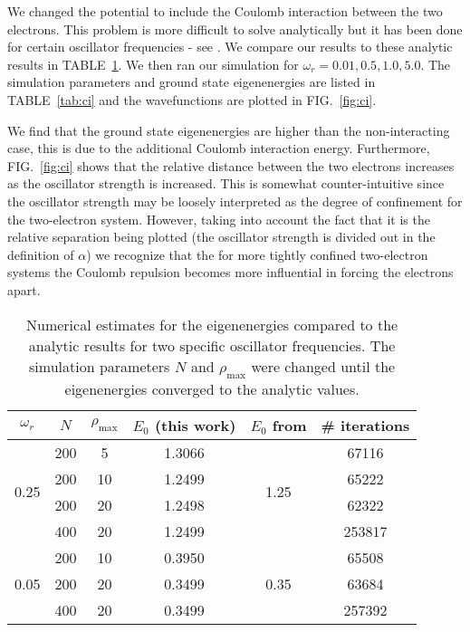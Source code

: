 \documentclass[10pt,showpacs,preprintnumbers,footinbib,amsmath,amssymb,aps,prl,twocolumn,groupedaddress,superscriptaddress,showkeys]{revtex4-1}
\newcommand{\rhomax}{
	\ensuremath{ \rho _{\mathrm{max}}} }
\begin{document}
{We changed the potential to include the Coulomb interaction between the two electrons.
This problem is more difficult to solve analytically but it has been done for certain oscillator
frequencies - see \citet{Taut1993}. We compare our results to these analytic results in
TABLE~\ref{tab:wrc}. We then ran our simulation for $\omega_r = 0.01,0.5,1.0,5.0$.
The simulation parameters and ground state eigenenergies are listed in TABLE~\ref{tab:ci}
and the wavefunctions are plotted in FIG.~\ref{fig:ci}.

We find that the ground state eigenenergies are higher than the non-interacting case,
this is due to the additional Coulomb interaction energy. Furthermore, FIG.~\ref{fig:ci}
shows that the relative distance between the two electrons increases as the oscillator strength
is increased. This is somewhat counter-intuitive since the oscillator strength may be loosely
interpreted as the degree of confinement for the two-electron system. However, taking into
account the fact that it is the relative separation being plotted (the oscillator strength is
divided out in the definition of $\alpha$) we recognize that the for more tightly confined
two-electron systems the Coulomb repulsion becomes more influential in forcing the electrons
apart.

\begin{table}
\centering
	\begin{tabular}{ c | c c | c c | c }
	$\omega_r$ & $N$ & \rhomax & $E_0$ (this work) & $E_0$ from \citep{Taut1993} & \# iterations\\
\hline
	\multirow{4}{*}{0.25} & 200 &   5 &  1.3066 & \multirow{4}{*}{1.25} & 67116\\
				         & 200 & 10 &  1.2499 &                                      & 65222\\
				         & 200 & 20 &  1.2498 &                                      & 62322\\
				         & 400 & 20 &  1.2499 &                                      & 253817\\
\hline
	\multirow{3}{*}{0.05} & 200 & 10 &  0.3950 & \multirow{3}{*}{0.35} & 65508\\
				         & 200 & 20 & 0.3499  &                                      & 63684\\
				         & 400 & 20 & 0.3499  &                                      & 257392 
	\end{tabular}
	\caption{Numerical estimates for the eigenenergies compared to the analytic results
	for two specific oscillator frequencies. The simulation parameters $N$ and \rhomax
	were changed until the eigenenergies converged to the analytic values.}
	\label{tab:wrc}
\end{table}

}
\end{document}
